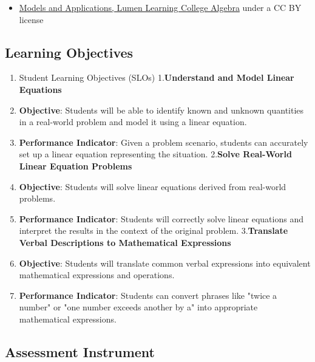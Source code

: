 \begin{itemize}
    \item \href{https://courses.lumenlearning.com/wmopen-collegealgebra/chapter/introduction-models-and-applications/}{Models and Applications, Lumen Learning College Algebra} under a CC BY license
\end{itemize}

\subsection{Learning Objectives}

\begin{enumerate}
    \item Student Learning Objectives (SLOs) 1.\textbf{Understand and Model Linear Equations}
    \item \textbf{Objective}: Students will be able to identify known and unknown quantities in a real-world problem and model it using a linear equation.
    \item \textbf{Performance Indicator}: Given a problem scenario, students can accurately set up a linear equation representing the situation. 2.\textbf{Solve Real-World Linear Equation Problems}
    \item \textbf{Objective}: Students will solve linear equations derived from real-world problems.
    \item \textbf{Performance Indicator}: Students will correctly solve linear equations and interpret the results in the context of the original problem. 3.\textbf{Translate Verbal Descriptions to Mathematical Expressions}
    \item \textbf{Objective}: Students will translate common verbal expressions into equivalent mathematical expressions and operations.
    \item \textbf{Performance Indicator}: Students can convert phrases like "twice a number" or "one number exceeds another by a" into appropriate mathematical expressions.
\end{enumerate}

\subsection{Assessment Instrument}

